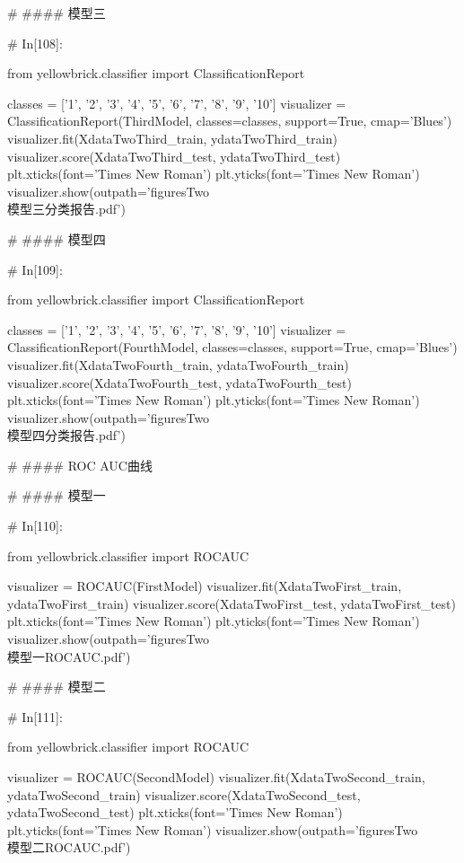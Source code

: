 \documentclass{MathorCupmodeling}
\begin{document}
\begin{python}
	# #### 模型三
	
	# In[108]:
	
	
	from yellowbrick.classifier import ClassificationReport
	
	classes = ['1', '2', '3', '4', '5', '6', '7', '8', '9', '10']
	visualizer = ClassificationReport(ThirdModel, classes=classes, support=True, cmap='Blues')
	visualizer.fit(XdataTwoThird_train, ydataTwoThird_train)
	visualizer.score(XdataTwoThird_test, ydataTwoThird_test)
	plt.xticks(font='Times New Roman')
	plt.yticks(font='Times New Roman')
	visualizer.show(outpath='figuresTwo\\[附件2]模型三分类报告.pdf')
	
	# #### 模型四
	
	# In[109]:
	
	
	from yellowbrick.classifier import ClassificationReport
	
	classes = ['1', '2', '3', '4', '5', '6', '7', '8', '9', '10']
	visualizer = ClassificationReport(FourthModel, classes=classes, support=True, cmap='Blues')
	visualizer.fit(XdataTwoFourth_train, ydataTwoFourth_train)
	visualizer.score(XdataTwoFourth_test, ydataTwoFourth_test)
	plt.xticks(font='Times New Roman')
	plt.yticks(font='Times New Roman')
	visualizer.show(outpath='figuresTwo\\[附件2]模型四分类报告.pdf')
	
	# #### ROC AUC曲线
	
	# #### 模型一
	
	# In[110]:
	
	
	from yellowbrick.classifier import ROCAUC
	
	visualizer = ROCAUC(FirstModel)
	visualizer.fit(XdataTwoFirst_train, ydataTwoFirst_train)
	visualizer.score(XdataTwoFirst_test, ydataTwoFirst_test)
	plt.xticks(font='Times New Roman')
	plt.yticks(font='Times New Roman')
	visualizer.show(outpath='figuresTwo\\[附件2]模型一ROCAUC.pdf')
	
	# #### 模型二
	
	# In[111]:
	
	
	from yellowbrick.classifier import ROCAUC
	
	visualizer = ROCAUC(SecondModel)
	visualizer.fit(XdataTwoSecond_train, ydataTwoSecond_train)
	visualizer.score(XdataTwoSecond_test, ydataTwoSecond_test)
	plt.xticks(font='Times New Roman')
	plt.yticks(font='Times New Roman')
	visualizer.show(outpath='figuresTwo\\[附件2]模型二ROCAUC.pdf')
	

\end{python}
\end{document}
